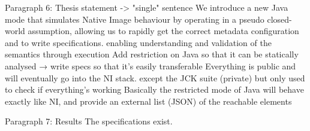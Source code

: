 Paragraph 6: Thesis statement -> "single" sentence
We introduce a new Java mode that simulates Native Image behaviour by operating in a pseudo closed-world assumption, allowing us to rapidly get the correct metadata configuration and to write specifications.
 enabling understanding and validation of the semantics through execution
Add restriction on Java so that it can be statically analysed → write specs so that it’s easily transferable
Everything is public and will eventually go into the NI stack. except the JCK suite (private) but only used to check if everything’s working
Basically the restricted mode of Java will behave exactly like NI, and provide an external list (JSON) of the reachable elements

Paragraph 7: Results
The specifications exist.